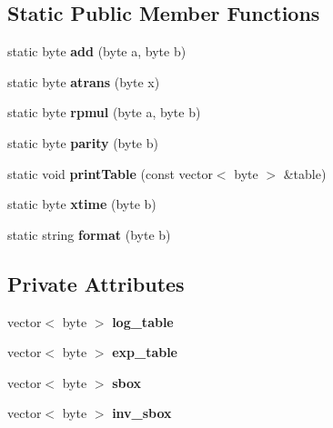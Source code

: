 \subsection*{Static Public Member Functions}
\begin{DoxyCompactItemize}
\item 
\mbox{\label{classAESMath_addc85b43cc512b64b72572a0d446c1ca}} 
static byte {\bfseries add} (byte a, byte b)
\item 
\mbox{\label{classAESMath_a68752913a10216b02ca7ee07d3cfce73}} 
static byte {\bfseries atrans} (byte x)
\item 
\mbox{\label{classAESMath_a520e8de49844b680fce0d35b95f62ef7}} 
static byte {\bfseries rpmul} (byte a, byte b)
\item 
\mbox{\label{classAESMath_ab80138d32a161659fffc62d1feba18c0}} 
static byte {\bfseries parity} (byte b)
\item 
\mbox{\label{classAESMath_a9f882d756de848b280e5bf36d8ae2651}} 
static void {\bfseries print\+Table} (const vector$<$ byte $>$ \&table)
\item 
\mbox{\label{classAESMath_a6ca9aef55b91f32f116a84280d5e6408}} 
static byte {\bfseries xtime} (byte b)
\item 
\mbox{\label{classAESMath_a4e823fb436d9a77d8078f2b39a912a6d}} 
static string {\bfseries format} (byte b)
\end{DoxyCompactItemize}
\subsection*{Private Attributes}
\begin{DoxyCompactItemize}
\item 
\mbox{\label{classAESMath_a287fd250ea67015652ea3fa292d900cd}} 
vector$<$ byte $>$ {\bfseries log\+\_\+table}
\item 
\mbox{\label{classAESMath_af6600fb4fd42edb4d6932cb376da0034}} 
vector$<$ byte $>$ {\bfseries exp\+\_\+table}
\item 
\mbox{\label{classAESMath_a606f45e378a2e7c0198ab06b2167f544}} 
vector$<$ byte $>$ {\bfseries sbox}
\item 
\mbox{\label{classAESMath_a6d0c4a4ec8a16a825fb116dd3f741b6b}} 
vector$<$ byte $>$ {\bfseries inv\+\_\+sbox}
\end{DoxyCompactItemize}


